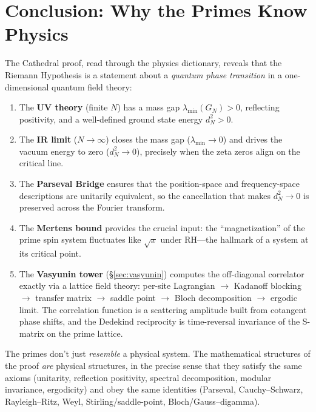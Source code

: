 \documentclass[11pt,a4paper]{article}
\theoremstyle{definition}
\begin{document}
\section{Conclusion: Why the Primes Know Physics}

The Cathedral proof, read through the physics dictionary, reveals that
the Riemann Hypothesis is a statement about a \emph{quantum phase
transition} in a one-dimensional quantum field theory:

\begin{enumerate}
  \item The \textbf{UV theory} (finite $N$) has a mass gap
    $\lambda_{\min}(G_N) > 0$, reflecting positivity, and a well-defined
    ground state energy $d_N^2 > 0$.

  \item The \textbf{IR limit} ($N \to \infty$) closes the mass gap
    ($\lambda_{\min} \to 0$) and drives the vacuum energy to zero
    ($d_N^2 \to 0$), precisely when the zeta zeros align on the
    critical line.

  \item The \textbf{Parseval Bridge} ensures that the position-space
    and frequency-space descriptions are unitarily equivalent, so the
    cancellation that makes $d_N^2 \to 0$ is preserved across the
    Fourier transform.

  \item The \textbf{Mertens bound} provides the crucial input: the
    ``magnetization'' of the prime spin system fluctuates like
    $\sqrt{x}$ under RH---the hallmark of a system at its critical
    point.

  \item The \textbf{Vasyunin tower} (\S\ref{sec:vasyunin}) computes the
    off-diagonal correlator exactly via a lattice field theory:
    per-site Lagrangian $\to$ Kadanoff blocking $\to$ transfer matrix
    $\to$ saddle point $\to$ Bloch decomposition $\to$ ergodic limit.
    The correlation function is a scattering amplitude built from
    cotangent phase shifts, and the Dedekind reciprocity is time-reversal
    invariance of the S-matrix on the prime lattice.
\end{enumerate}

The primes don't just \emph{resemble} a physical system. The
mathematical structures of the proof \emph{are} physical structures,
in the precise sense that they satisfy the same axioms (unitarity,
reflection positivity, spectral decomposition, modular invariance,
ergodicity)
and obey the same identities (Parseval, Cauchy--Schwarz, Rayleigh--Ritz,
Weyl, Stirling/saddle-point, Bloch/Gauss--digamma).
\end{document}
